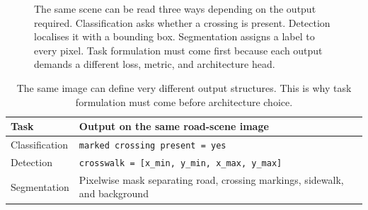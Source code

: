 \begin{figure}[t]
{%
}
\caption{The same scene can be read three ways depending on the output required. Classification asks whether a crossing is present. Detection localises it with a bounding box. Segmentation assigns a label to every pixel. Task formulation must come first because each output demands a different loss, metric, and architecture head.}
\label{fig:vision-street-scene}
\end{figure}

\begin{table}[t]
\centering
\small
\begin{tabular}{p{2.12cm}p{7.83cm}}
\toprule
Task & Output on the same road-scene image \\
\midrule
Classification & \texttt{marked crossing present = yes} \\
Detection & \texttt{crosswalk = [x\_min, y\_min, x\_max, y\_max]} \\
Segmentation & Pixelwise mask separating road, crossing markings, sidewalk, and background \\
\bottomrule
\end{tabular}
\caption{The same image can define very different output structures. This is why task formulation must come before architecture choice.}
\label{tab:vision-task-output-structure}
\end{table}


